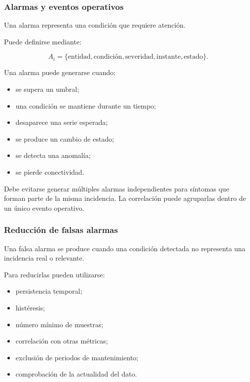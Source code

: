 \subsubsection*{Alarmas y eventos operativos}

Una alarma representa una condición que requiere atención.

Puede definirse mediante:

\[
    A_i
    =
    \{
        \text{entidad},
        \text{condición},
        \text{severidad},
        \text{instante},
        \text{estado}
    \}.
\]

Una alarma puede generarse cuando:

\begin{itemize}
    \item se supera un umbral;

    \item una condición se mantiene durante un tiempo;

    \item desaparece una serie esperada;

    \item se produce un cambio de estado;

    \item se detecta una anomalía;

    \item se pierde conectividad.
\end{itemize}

Debe evitarse generar múltiples alarmas independientes para síntomas que
forman parte de la misma incidencia. La correlación puede agruparlas
dentro de un único evento operativo.


\subsubsection*{Reducción de falsas alarmas}

Una falsa alarma se produce cuando una condición detectada no representa
una incidencia real o relevante.

Para reducirlas pueden utilizarse:

\begin{itemize}
    \item persistencia temporal;

    \item histéresis;

    \item número mínimo de muestras;

    \item correlación con otras métricas;

    \item exclusión de periodos de mantenimiento;

    \item comprobación de la actualidad del dato.
\end{itemize}


